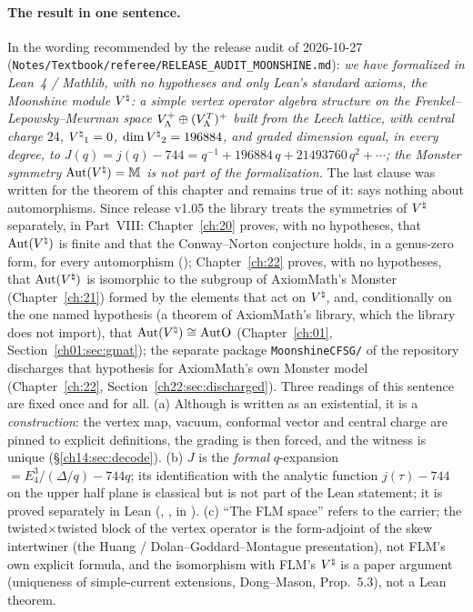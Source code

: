 \paragraph{The result in one sentence.}  In the wording recommended by the release audit of
2026-10-27 (\texttt{Notes/Textbook/referee/RELEASE\_AUDIT\_MOONSHINE.md}): \emph{we have formalized
in Lean~4 / Mathlib, with no hypotheses and only Lean's standard axioms, the Moonshine module
${V^{\natural}}$: a simple vertex operator algebra structure on the Frenkel--Lepowsky--Meurman space
$V_{\Lambda}^+\oplus(V_{\Lambda}^T)^+$ built from the Leech lattice, with central charge $24$,
${V^{\natural}}_1=0$, $\dim{V^{\natural}}_2=196884$, and graded dimension equal, in every degree, to
$J(q)=j(q)-744=q^{-1}+196884\,q+21493760\,q^2+\cdots$; the Monster symmetry $\operatorname{Aut}({V^{\natural}})=\mathbb M$ is
not part of the formalization.}  The last clause was written for the theorem of this chapter and remains true of it:
 says nothing about automorphisms.  Since release v1.05 the library treats the symmetries of ${V^{\natural}}$
separately, in Part~VIII: Chapter~\ref{ch:20} proves, with no hypotheses, that $\operatorname{Aut}({V^{\natural}})$ is finite and that the
Conway--Norton conjecture holds, in a genus-zero form, for every automorphism (); Chapter~\ref{ch:22}
proves, with no hypotheses, that $\operatorname{Aut}({V^{\natural}})$ is isomorphic to the subgroup of AxiomMath's Monster 
(Chapter~\ref{ch:21}) formed by the elements that act on ${V^{\natural}}$, and, conditionally on the one named hypothesis
 (a theorem of AxiomMath's library, which the library does not import), that
$\operatorname{Aut}({V^{\natural}})\cong\mathrm{AutO}$ (Chapter~\ref{ch:01}, Section~\ref{ch01:sec:gmat}); the separate package
\texttt{MoonshineCFSG/} of the repository discharges that hypothesis for AxiomMath's own Monster model
(Chapter~\ref{ch:22}, Section~\ref{ch22:sec:discharged}).  Three readings of this sentence are fixed once and for all.
(a) Although  is written as an existential, it is a \emph{construction}: the vertex
map, vacuum, conformal vector and central charge are pinned to explicit definitions, the grading is
then forced, and the witness is unique (\S\ref{ch14:sec:decode}).  (b) $J$ is the \emph{formal}
$q$-expansion  $=E_4^3/(\Delta/q)-744q$; its identification with the analytic function
$j(\tau)-744$ on the upper half plane is classical but is not part of the Lean statement; it is proved separately in Lean
(, , in ).
(c) ``The FLM space'' refers to the carrier; the twisted$\times$twisted block of the vertex
operator is the form-adjoint of the skew intertwiner (the Huang / Dolan--Goddard--Montague
presentation), not FLM's own explicit formula, and the isomorphism with FLM's ${V^{\natural}}$ is a paper
argument (uniqueness of simple-current extensions, Dong--Mason, Prop.~5.3), not a Lean theorem.

